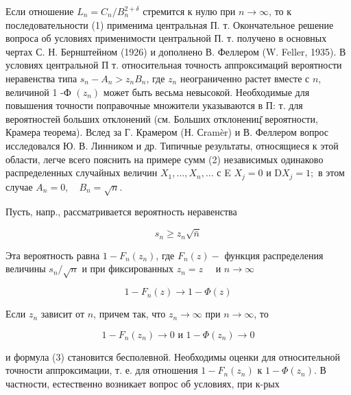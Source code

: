 \documentclass[10pt]{article}
\begin{document}
Если отношение $L_{n}=C_{n} / B_{n}^{2+\delta}$ стремится к нулю при $n \rightarrow \infty$, то к последовательности (1) применима центральная П. т. Окончательное решение вопроса об условиях применимости центральной П. т. получено в основных чертах С. Н. Бернштейном (1926) и дополнено В. Феллером (W. Feller, 1935). В условиях центральной П т. относительная точность аппроксимаций вероятности неравенства типа $s_{n}-A_{n}>z_{n} B_{n}$, где $z_{n}$ неограниченно растет вместе с $n$, величиной 1 -Ф $\left(z_{n}\right)$ может быть весьма невысокой. Необходимые для повышения точности поправочные множители указываются в П: т. для вероятностей больших отклонений (см. Больших отклонениц̆ вероятности, Крамера теорема). Вслед за Г. Крамером (Н. Сramèr) и В. Феллером вопрос исследовался Ю. В. Линником и др. Типичные результаты, относящиеся к этой области, легче всего пояснить на примере сумм (2) независимых одинаково распределенных случайных величин $X_{1}, \ldots, X_{n}, \ldots$ с E $X_{j}=0$ и $\mathrm{D} X_{j}=1 ;$ в этом случае $A_{n}=0, \quad B_{n}=\sqrt{n}$.



Пусть, напр., рассматривается вероятность неравенства



\[

s_{n} \geqslant z_{n} \sqrt{\bar{n}}

\]



Эта вероятность равна $1-F_{n}\left(z_{n}\right)$, где $F_{n}(z)-$ функция распределения величины $s_{n} / \sqrt{n}$ и при фиксированных $z_{n}=z \quad$ и $n \rightarrow \infty$



\[

1-F_{n}(z) \rightarrow 1-\Phi(z)

\]



Если $z_{n}$ зависит от $n$, причем так, что $z_{n} \rightarrow \infty$ при $n \rightarrow \infty$, то



\[

1-F_{n}\left(z_{n}\right) \longrightarrow 0 \text { и } 1-\Phi\left(z_{n}\right) \longrightarrow 0

\]



и формула (3) становится бесполевной. Необходимы оценки для относительной точности аппроксимации, т. е. для отношения $1-F_{n}\left(z_{n}\right)$ к $1-\Phi\left(z_{n}\right)$. В частности, естественно возникает вопрос об условиях, при к-рых
\end{document}
